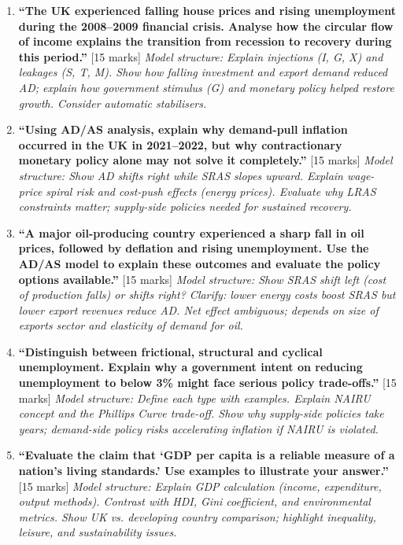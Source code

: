 \documentclass[11pt, a4paper, twoside]{book}
\begin{document}
\begin{exampractice}
\begin{enumerate}[leftmargin=*]
\item \textbf{``The UK experienced falling house prices and rising unemployment during the 2008--2009 financial crisis. Analyse how the circular flow of income explains the transition from recession to recovery during this period.''} [15 marks]
\textit{Model structure: Explain injections (I, G, X) and leakages (S, T, M). Show how falling investment and export demand reduced AD; explain how government stimulus (G) and monetary policy helped restore growth. Consider automatic stabilisers.}

\item \textbf{``Using AD/AS analysis, explain why demand-pull inflation occurred in the UK in 2021--2022, but why contractionary monetary policy alone may not solve it completely.''} [15 marks]
\textit{Model structure: Show AD shifts right while SRAS slopes upward. Explain wage-price spiral risk and cost-push effects (energy prices). Evaluate why LRAS constraints matter; supply-side policies needed for sustained recovery.}

\item \textbf{``A major oil-producing country experienced a sharp fall in oil prices, followed by deflation and rising unemployment. Use the AD/AS model to explain these outcomes and evaluate the policy options available.''} [15 marks]
\textit{Model structure: Show SRAS shift left (cost of production falls) or shifts right? Clarify: lower energy costs boost SRAS but lower export revenues reduce AD. Net effect ambiguous; depends on size of exports sector and elasticity of demand for oil.}

\item \textbf{``Distinguish between frictional, structural and cyclical unemployment. Explain why a government intent on reducing unemployment to below 3\% might face serious policy trade-offs.''} [15 marks]
\textit{Model structure: Define each type with examples. Explain NAIRU concept and the Phillips Curve trade-off. Show why supply-side policies take years; demand-side policy risks accelerating inflation if NAIRU is violated.}

\item \textbf{``Evaluate the claim that `GDP per capita is a reliable measure of a nation's living standards.' Use examples to illustrate your answer.''} [15 marks]
\textit{Model structure: Explain GDP calculation (income, expenditure, output methods). Contrast with HDI, Gini coefficient, and environmental metrics. Show UK vs. developing country comparison; highlight inequality, leisure, and sustainability issues.}
\end{enumerate}
\end{exampractice}
\end{document}
